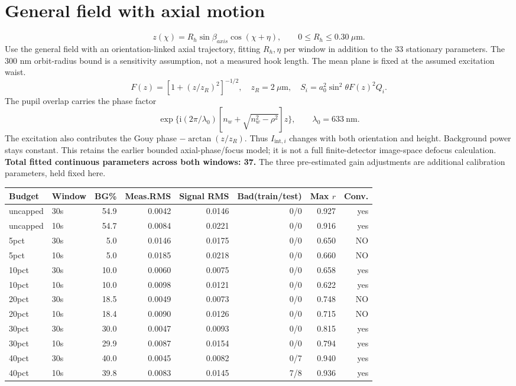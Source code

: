 \documentclass[10pt,a4paper]{article}
\begin{document}
\section{General field with axial motion}
\[z(\chi)=R_h\sin\beta_{axis}\cos(\chi+\eta),\qquad 0\leq R_h\leq0.30\ \mu\mathrm m.\]
Use the general field with an orientation-linked axial trajectory, fitting $R_h,\eta$ per window in addition to the 33 stationary parameters. The 300 nm orbit-radius bound is a sensitivity assumption, not a measured hook length. The mean plane is fixed at the assumed excitation waist.
\[F(z)=[1+(z/z_R)^2]^{-1/2},\quad z_R=2\ \mu\mathrm m,\quad
S_i=a_0^2\sin^2\theta F(z)^2Q_i.\]
The pupil overlap carries the phase factor\[\exp\{\mathrm i(2\pi/\lambda_0)[n_w+\sqrt{n_w^2-\rho^2}]z\},\qquad \lambda_0=633\ \mathrm{nm}.\]The excitation also contributes the Gouy phase $-\arctan(z/z_R)$. Thus $I_{\mathrm{int},i}$ changes with both orientation and height. Background power stays constant. This retains the earlier bounded axial-phase/focus model; it is not a full finite-detector image-space defocus calculation.
\textbf{Total fitted continuous parameters across both windows: 37.} The three pre-estimated gain adjustments are additional calibration parameters, held fixed here.
\begin{longtable}{llrrrrrr}\toprule
Budget & Window & BG\% & Meas.RMS & Signal RMS & Bad(train/test) & Max $r$ & Conv.\\\midrule\endhead
uncapped & 30s & 54.9 & 0.0042 & 0.0146 & 0/0 & 0.927 & yes \\
uncapped & 10s & 54.7 & 0.0084 & 0.0221 & 0/0 & 0.916 & yes \\
5pct & 30s & 5.0 & 0.0146 & 0.0175 & 0/0 & 0.650 & NO \\
5pct & 10s & 5.0 & 0.0185 & 0.0218 & 0/0 & 0.660 & NO \\
10pct & 30s & 10.0 & 0.0060 & 0.0075 & 0/0 & 0.658 & yes \\
10pct & 10s & 10.0 & 0.0098 & 0.0121 & 0/0 & 0.622 & yes \\
20pct & 30s & 18.5 & 0.0049 & 0.0073 & 0/0 & 0.748 & NO \\
20pct & 10s & 18.4 & 0.0090 & 0.0126 & 0/0 & 0.715 & NO \\
30pct & 30s & 30.0 & 0.0047 & 0.0093 & 0/0 & 0.815 & yes \\
30pct & 10s & 29.9 & 0.0087 & 0.0154 & 0/0 & 0.794 & yes \\
40pct & 30s & 40.0 & 0.0045 & 0.0082 & 0/7 & 0.940 & yes \\
40pct & 10s & 39.8 & 0.0083 & 0.0145 & 7/8 & 0.936 & yes \\
\bottomrule\end{longtable}
\end{document}

